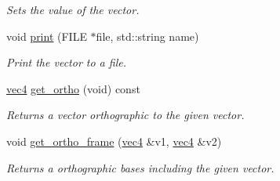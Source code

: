 \begin{DoxyCompactItemize}
\begin{DoxyCompactList}\small\item\em \-Sets the value of the vector. \end{DoxyCompactList}\item 
\hypertarget{classutil_1_1math_1_1vec4_a6f950723bf184a6f9832d4dc6f496026}{void \hyperlink{classutil_1_1math_1_1vec4_a6f950723bf184a6f9832d4dc6f496026}{print} (\-F\-I\-L\-E $\ast$file, std\-::string name)}\label{classutil_1_1math_1_1vec4_a6f950723bf184a6f9832d4dc6f496026}

\begin{DoxyCompactList}\small\item\em \-Print the vector to a file. \end{DoxyCompactList}\item 
\hypertarget{classutil_1_1math_1_1vec4_aa186a79ff7cb254f5a7380cc1acada3d}{\hyperlink{classutil_1_1math_1_1vec4}{vec4} \hyperlink{classutil_1_1math_1_1vec4_aa186a79ff7cb254f5a7380cc1acada3d}{get\-\_\-ortho} (void) const }\label{classutil_1_1math_1_1vec4_aa186a79ff7cb254f5a7380cc1acada3d}

\begin{DoxyCompactList}\small\item\em \-Returns a vector orthographic to the given vector. \end{DoxyCompactList}\item 
\hypertarget{classutil_1_1math_1_1vec4_a818bc5a39fca3fced9cf5828a0cb70c6}{void \hyperlink{classutil_1_1math_1_1vec4_a818bc5a39fca3fced9cf5828a0cb70c6}{get\-\_\-ortho\-\_\-frame} (\hyperlink{classutil_1_1math_1_1vec4}{vec4} \&v1, \hyperlink{classutil_1_1math_1_1vec4}{vec4} \&v2)}\label{classutil_1_1math_1_1vec4_a818bc5a39fca3fced9cf5828a0cb70c6}

\begin{DoxyCompactList}\small\item\em \-Returns a orthographic bases including the given vector. \end{DoxyCompactList}\end{DoxyCompactItemize}
{\bf }\par
